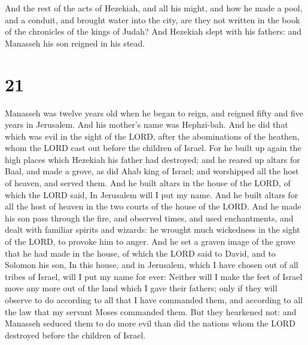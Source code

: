  And the rest of the acts of Hezekiah, and all his might,
and how he made a pool, and a conduit, and brought water into the city,
are they not written in the book of the chronicles of the kings of
Judah?  And Hezekiah slept with his fathers: and Manasseh
his son reigned in his stead.

\hypertarget{section-20}{%
\section{21}\label{section-20}}

 Manasseh was twelve years old when he began to reign, and
reigned fifty and five years in Jerusalem. And his mother's name was
Hephzi-bah.  And he did that which was evil in the sight
of the LORD, after the abominations of the heathen, whom the LORD cast
out before the children of Israel.  For he built up again
the high places which Hezekiah his father had destroyed; and he reared
up altars for Baal, and made a grove, as did Ahab king of Israel; and
worshipped all the host of heaven, and served them.  And
he built altars in the house of the LORD, of which the LORD said, In
Jerusalem will I put my name.  And he built altars for all
the host of heaven in the two courts of the house of the LORD.
 And he made his son pass through the fire, and observed
times, and used enchantments, and dealt with familiar spirits and
wizards: he wrought much wickedness in the sight of the LORD, to provoke
him to anger.  And he set a graven image of the grove that
he had made in the house, of which the LORD said to David, and to
Solomon his son, In this house, and in Jerusalem, which I have chosen
out of all tribes of Israel, will I put my name for ever: 
Neither will I make the feet of Israel move any more out of the land
which I gave their fathers; only if they will observe to do according to
all that I have commanded them, and according to all the law that my
servant Moses commanded them.  But they hearkened not: and
Manasseh seduced them to do more evil than did the nations whom the LORD
destroyed before the children of Israel.

